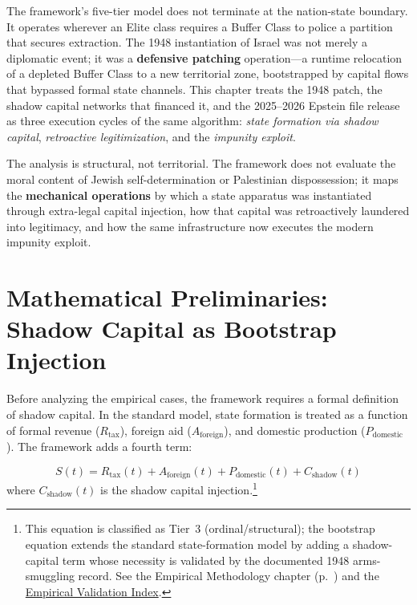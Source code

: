 \medskip

The framework's five-tier model does not terminate at the nation-state boundary. It operates wherever an Elite class requires a Buffer Class to police a partition that secures extraction. The 1948 instantiation of Israel was not merely a diplomatic event; it was a \textbf{defensive patching} operation---a runtime relocation of a depleted Buffer Class to a new territorial zone, bootstrapped by capital flows that bypassed formal state channels. This chapter treats the 1948 patch, the shadow capital networks that financed it, and the 2025--2026 Epstein file release as three execution cycles of the same algorithm: \textit{state formation via shadow capital}, \textit{retroactive legitimization}, and the \textit{impunity exploit}.

The analysis is structural, not territorial. The framework does not evaluate the moral content of Jewish self-determination or Palestinian dispossession; it maps the \textbf{mechanical operations} by which a state apparatus was instantiated through extra-legal capital injection, how that capital was retroactively laundered into legitimacy, and how the same infrastructure now executes the modern impunity exploit.

\section{Mathematical Preliminaries: Shadow Capital as Bootstrap Injection}

Before analyzing the empirical cases, the framework requires a formal definition of shadow capital. In the standard model, state formation is treated as a function of formal revenue ($R_{\text{tax}}$), foreign aid ($A_{\text{foreign}}$), and domestic production ($P_{\text{domestic}}$). The framework adds a fourth term:

\begin{equation}\label{eq:gp0-bootstrap}
S(t) = R_{\text{tax}}(t) + A_{\text{foreign}}(t) + P_{\text{domestic}}(t) + C_{\text{shadow}}(t)
\end{equation}
where $C_{\text{shadow}}(t)$ is the shadow capital injection.\footnote{This equation is classified as Tier~3 (ordinal/structural); the bootstrap equation extends the standard state-formation model by adding a shadow-capital term whose necessity is validated by the documented 1948 arms-smuggling record. See the Empirical Methodology chapter (p.~\pageref{ch:empirical_methodology}) and the \hyperref[app:empirical_index]{Empirical Validation Index}.}

